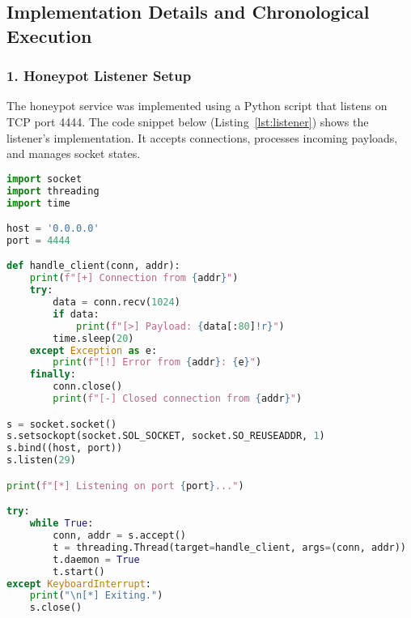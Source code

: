 \documentclass{article}
\begin{document}
\subsection*{Implementation Details and Chronological Execution}

\subsubsection*{1. Honeypot Listener Setup}
The honeypot service was implemented using a Python script that listens on TCP port 4444. The code snippet below (Listing~\ref{lst:listener}) shows the listener's implementation. It accepts connections, processes incoming payloads, and manages socket states.
\begin{lstlisting}[language=python, caption={Honeypot Listener Code (\texttt{listener\_4444.py})}, label={lst:listener}]
import socket
import threading
import time

host = '0.0.0.0'
port = 4444

def handle_client(conn, addr):
    print(f"[+] Connection from {addr}")
    try:
        data = conn.recv(1024)
        if data:
            print(f"[>] Payload: {data[:80]!r}")
        time.sleep(20)
    except Exception as e:
        print(f"[!] Error from {addr}: {e}")
    finally:
        conn.close()
        print(f"[-] Closed connection from {addr}")

s = socket.socket()
s.setsockopt(socket.SOL_SOCKET, socket.SO_REUSEADDR, 1)
s.bind((host, port))
s.listen(29)

print(f"[*] Listening on port {port}...")

try:
    while True:
        conn, addr = s.accept()
        t = threading.Thread(target=handle_client, args=(conn, addr))
        t.daemon = True
        t.start()
except KeyboardInterrupt:
    print("\n[*] Exiting.")
    s.close()
\end{lstlisting}
\end{document}
